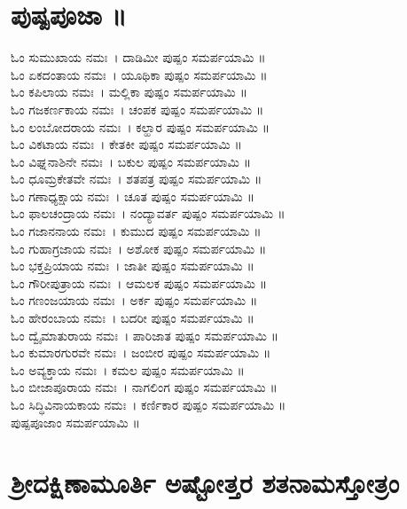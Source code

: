 \section{ಪುಷ್ಪಪೂಜಾ ॥}
ಓಂ ಸುಮುಖಾಯ ನಮಃ~। ದಾಡಿಮೀ ಪುಷ್ಪಂ ಸಮರ್ಪಯಾಮಿ ॥\\
ಓಂ ಏಕದಂತಾಯ ನಮಃ~। ಯೂಥಿಕಾ ಪುಷ್ಪಂ ಸಮರ್ಪಯಾಮಿ ॥\\
ಓಂ ಕಪಿಲಾಯ ನಮಃ~। ಮಲ್ಲಿಕಾ ಪುಷ್ಪಂ ಸಮರ್ಪಯಾಮಿ ॥\\
ಓಂ ಗಜಕರ್ಣಕಾಯ ನಮಃ~। ಚಂಪಕ ಪುಷ್ಪಂ ಸಮರ್ಪಯಾಮಿ ॥\\
ಓಂ ಲಂಬೋದರಾಯ ನಮಃ~। ಕಲ್ಹಾರ ಪುಷ್ಪಂ ಸಮರ್ಪಯಾಮಿ ॥\\
ಓಂ ವಿಕಟಾಯ ನಮಃ~। ಕೇತಕೀ ಪುಷ್ಪಂ ಸಮರ್ಪಯಾಮಿ ॥\\
ಓಂ ವಿಘ್ನನಾಶಿನೇ ನಮಃ~। ಬಕುಲ ಪುಷ್ಪಂ ಸಮರ್ಪಯಾಮಿ ॥\\
ಓಂ ಧೂಮ್ರಕೇತವೇ ನಮಃ~। ಶತಪತ್ರ ಪುಷ್ಪಂ ಸಮರ್ಪಯಾಮಿ ॥\\
ಓಂ ಗಣಾಧ್ಯಕ್ಷಾಯ ನಮಃ~। ಚೂತ ಪುಷ್ಪಂ ಸಮರ್ಪಯಾಮಿ ॥\\
ಓಂ ಫಾಲಚಂದ್ರಾಯ ನಮಃ~। ನಂದ್ಯಾವರ್ತ ಪುಷ್ಪಂ ಸಮರ್ಪಯಾಮಿ ॥\\
ಓಂ ಗಜಾನನಾಯ ನಮಃ~। ಕುಮುದ ಪುಷ್ಪಂ ಸಮರ್ಪಯಾಮಿ ॥\\
ಓಂ ಗುಹಾಗ್ರಜಾಯ ನಮಃ~। ಅಶೋಕ ಪುಷ್ಪಂ ಸಮರ್ಪಯಾಮಿ ॥\\
ಓಂ ಭಕ್ತಪ್ರಿಯಾಯ ನಮಃ~। ಜಾತೀ ಪುಷ್ಪಂ ಸಮರ್ಪಯಾಮಿ ॥\\
ಓಂ ಗೌರೀಪುತ್ರಾಯ ನಮಃ~। ಆಮಲಕ ಪುಷ್ಪಂ ಸಮರ್ಪಯಾಮಿ ॥\\
ಓಂ ಗಣಂಜಯಾಯ ನಮಃ~। ಅರ್ಕ ಪುಷ್ಪಂ ಸಮರ್ಪಯಾಮಿ ॥\\
ಓಂ ಹೇರಂಬಾಯ ನಮಃ~। ಬದರೀ ಪುಷ್ಪಂ ಸಮರ್ಪಯಾಮಿ ॥\\
ಓಂ ದ್ವೈಮಾತುರಾಯ ನಮಃ~। ಪಾರಿಜಾತ ಪುಷ್ಪಂ ಸಮರ್ಪಯಾಮಿ ॥\\
ಓಂ ಕುಮಾರಗುರವೇ ನಮಃ~। ಜಂಬೀರ ಪುಷ್ಪಂ ಸಮರ್ಪಯಾಮಿ ॥\\
ಓಂ ಅವ್ಯಕ್ತಾಯ ನಮಃ~। ಕಮಲ ಪುಷ್ಪಂ ಸಮರ್ಪಯಾಮಿ ॥\\
ಓಂ ಬೀಜಾಪೂರಾಯ ನಮಃ~। ನಾಗಲಿಂಗ ಪುಷ್ಪಂ ಸಮರ್ಪಯಾಮಿ ॥\\
ಓಂ ಸಿದ್ಧಿವಿನಾಯಕಾಯ ನಮಃ~। ಕರ್ಣಿಕಾರ ಪುಷ್ಪಂ ಸಮರ್ಪಯಾಮಿ ॥\\
ಪುಷ್ಪಪೂಜಾಂ ಸಮರ್ಪಯಾಮಿ ॥

\section{ಶ್ರೀದಕ್ಷಿಣಾಮೂರ್ತಿ ಅಷ್ಟೋತ್ತರ ಶತನಾಮಸ್ತೋತ್ರಂ }

